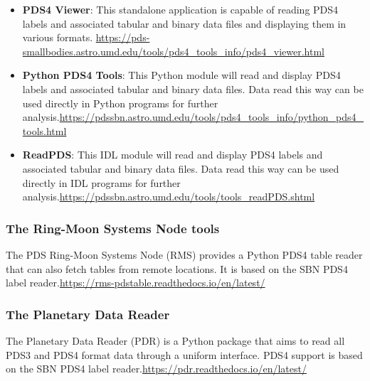 \begin{itemize}
\item \textbf{PDS4 Viewer}: This standalone application is capable of reading PDS4 labels and associated tabular and binary data files and displaying them in various formats. \newline \href{https://pds-smallbodies.astro.umd.edu/tools/pds4_tools_info/pds4_viewer.html}{https://pds-smallbodies.astro.umd.edu/tools/pds4\_\allowbreak{}tools\_\allowbreak{}info/pds4\_\allowbreak{}viewer.html}
\item \textbf{Python PDS4 Tools}: This Python module will read and display PDS4 labels and associated tabular and binary data files. Data read this way can be used directly in Python programs for further analysis.\newline \href{https://pdssbn.astro.umd.edu/tools/pds4_tools_info/python_pds4_tools.html}{https://pdssbn.astro.umd.edu/tools/pds4\_\allowbreak{}tools\_\allowbreak{}info/python\_\allowbreak{}pds4\_\allowbreak{}tools.html}
\item \textbf{ReadPDS}: This IDL module will read and display PDS4 labels and associated tabular and binary data files. Data read this way can be used directly in IDL programs for further analysis.\newline \href{https://pdssbn.astro.umd.edu/tools/tools_readPDS.shtml}{https://pdssbn.astro.umd.edu/tools/tools\_\allowbreak{}readPDS.shtml}
\end{itemize}

\subsubsection{The Ring-Moon Systems Node tools}
\label{sec:the-ring-moon-systems-node-tools}

The PDS Ring-Moon Systems Node (RMS) provides a Python PDS4 table reader that can also fetch tables from remote locations. It is based on the SBN PDS4 label reader.\newline \href{https://rms-pdstable.readthedocs.io/en/latest/}{https://rms-pdstable.readthedocs.io/en/latest/}


\subsubsection{The Planetary Data Reader}
\label{sec:the-planetary-data-reader}

The Planetary Data Reader (PDR) is a Python package that aims to read all PDS3 and PDS4 format data through a uniform interface. PDS4 support is based on the SBN PDS4 label reader.\newline \href{https://pdr.readthedocs.io/en/latest/}{https://pdr.readthedocs.io/en/latest/}


